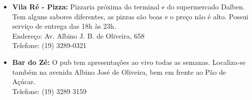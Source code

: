 \begin{itemize}
    \item   \textbf{Vila Ré - Pizza:} Pizzaria próxima do terminal e do
        supermercado Dalben. Tem alguns sabores diferentes, as pizzas são boas e
        o preço não é alto. Possui serviço de entrega das 18h às 23h.
        \\Endereço: Av. Albino J. B. de Oliveira, 658
        \\Telefone: (19) 3289-0321

    \item   \textbf{Bar do Zé:} O pub tem apresentações ao vivo todas as
        semanas.  Localiza-se também na avenida Albino José de Oliveira, bem em
        frente ao Pão de Açúcar.
        \\Telefone: (19) 3289 3159
\end{itemize}
